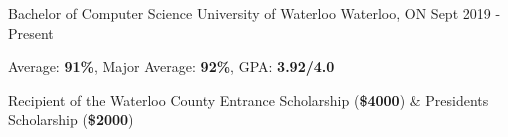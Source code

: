 
\begin{cventries}
  \cventry
    {Bachelor of Computer Science} %
    {University of Waterloo} %
    {Waterloo, ON} %
    {Sept 2019 - Present} %
    {
      \begin{cvitems} %
        \item{Average: \textbf{91\%}, Major Average: \textbf{92\%}, GPA: \textbf{3.92/4.0}}
        \item {Recipient of the Waterloo County Entrance Scholarship (\textbf{\$4000}) \& President\textquotesingle s Scholarship (\textbf{\$2000})}
      \end{cvitems}
    }
\end{cventries}
